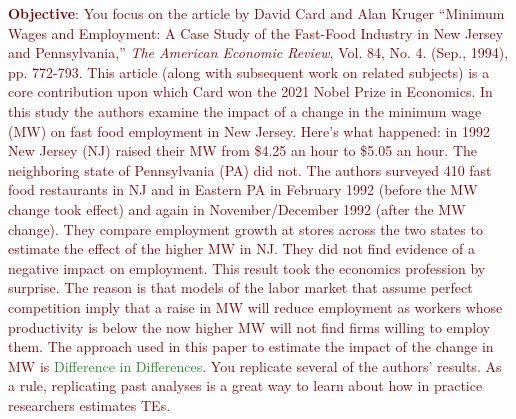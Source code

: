 \documentclass{article}
\begin{document}
\noindent \textcolor{Maroon}{\textbf{Objective}: You focus on the article by David Card and Alan Kruger ``Minimum Wages and Employment: A Case Study of the Fast-Food Industry in New Jersey and Pennsylvania,'' \textit{The American Economic Review}, Vol. 84, No. 4. (Sep., 1994), pp. 772-793. This article (along with subsequent work on related subjects) is a core contribution upon which Card won the 2021 Nobel Prize in Economics. In this study the authors examine the impact of a change in the minimum wage (MW) on fast food employment in New Jersey. Here's what happened: in 1992 New Jersey (NJ) raised their MW from \$4.25 an hour to \$5.05 an hour. The neighboring state of Pennsylvania (PA) did not. The authors surveyed 410 fast food restaurants in NJ and in Eastern PA in February 1992 (before the MW change took effect) and again in November/December 1992 (after the MW change). They compare employment growth at stores across the two states to estimate the effect of the higher MW in NJ. They did not find evidence of a negative impact on employment. This result took the economics profession by surprise. The reason is that models of the labor market that assume perfect competition imply that a raise in MW will reduce employment as workers whose productivity is below the now higher MW will not find firms willing to employ them. The approach used in this paper to estimate the impact of the change in MW is \textcolor{ForestGreen}{Difference in Differences}. You replicate several of the authors' results. As a rule, replicating past analyses is a great way to learn about how in practice researchers estimates TEs.}
\end{document}
